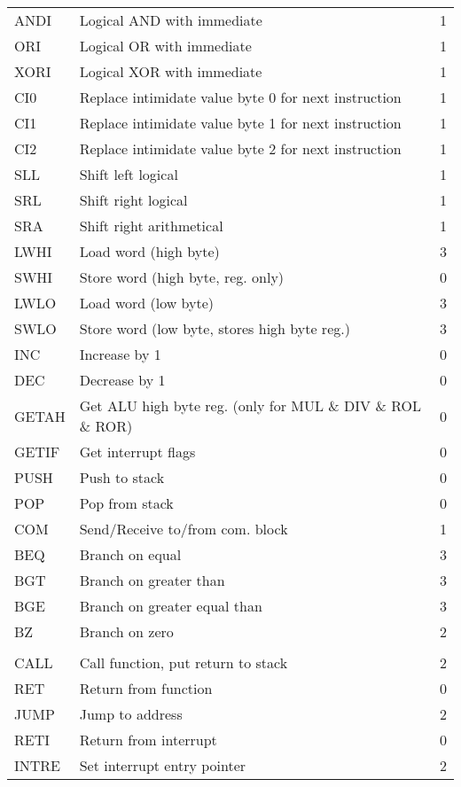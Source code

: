 \begin{longtable}[h!]{| l | p{} | c |}
ANDI & Logical AND with immediate & 1 \\
ORI  &  Logical OR with immediate & 1 \\
XORI &  Logical XOR with immediate & 1 \\\hline

CI0  & Replace intimidate value byte 0 for next instruction & 1 \\
CI1  & Replace intimidate value byte 1 for next instruction & 1 \\
CI2  & Replace intimidate value byte 2 for next instruction & 1 \\\hline

SLL  & Shift left logical & 1 \\
SRL  & Shift right logical & 1 \\
SRA  & Shift right arithmetical & 1 \\\hline

LWHI & Load word (high byte) & 3 \\
SWHI & Store word (high byte, reg. only) & 0 \\
LWLO & Load word (low byte) & 3 \\
SWLO & Store word (low byte, stores high byte reg.) & 3 \\\hline

INC  & Increase by 1 & 0 \\
DEC  & Decrease by 1 & 0 \\
GETAH& Get ALU high byte reg. (only for MUL \& DIV \& ROL \& ROR) & 0 \\
GETIF& Get interrupt flags & 0 \\\hline

PUSH & Push to stack & 0 \\
POP  & Pop from stack & 0 \\
COM  & Send/Receive to/from com. block & 1 \\\hline

BEQ  & Branch on equal & 3 \\
BGT  & Branch on greater than & 3 \\
BGE  & Branch on greater equal than & 3 \\
BZ   & Branch on zero & 2 \\

\arrayrulecolor{black}\hline
\multicolumn{3}{|c|}{
	\cellcolor[rgb]{0.7,0.7,1}\textit{0 register instructions}
} \\
\hline\arrayrulecolor[rgb]{0.82,0.82,0.82} 

CALL & Call function, put return to stack & 2 \\
RET  & Return from function & 0 \\
JUMP & Jump to address & 2 \\
RETI & Return from interrupt & 0 \\
INTRE& Set interrupt entry pointer & 2 \\\hline


\end{longtable}	

